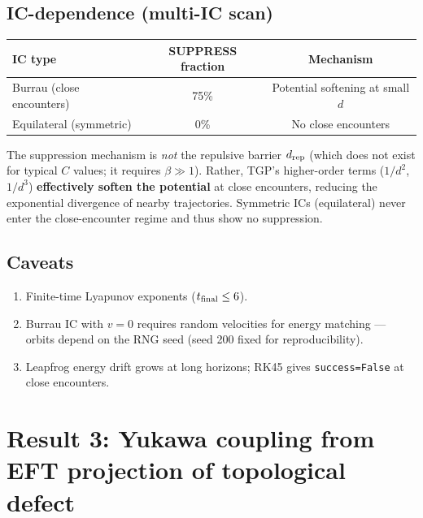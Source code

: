 \documentclass[11pt,a4paper]{article}
\newcommand{\drep}{d_{\rm rep}}
\begin{document}
\subsection{IC-dependence (multi-IC scan)}

\begin{center}
\begin{tabular}{lcc}
  \toprule
  \textbf{IC type} & \textbf{SUPPRESS fraction} & \textbf{Mechanism} \\
  \midrule
  Burrau (close encounters) & 75\% & Potential softening at small $d$ \\
  Equilateral (symmetric) & 0\% & No close encounters \\
  \bottomrule
\end{tabular}
\end{center}

The suppression mechanism is \emph{not} the repulsive barrier $\drep$
(which does not exist for typical $C$ values; it requires
$\beta \gg 1$).  Rather, TGP's higher-order terms ($1/d^2$, $1/d^3$)
\textbf{effectively soften the potential} at close encounters, reducing
the exponential divergence of nearby trajectories.  Symmetric ICs
(equilateral) never enter the close-encounter regime and thus show no
suppression.

\subsection{Caveats}

\begin{enumerate}[nosep]
  \item Finite-time Lyapunov exponents ($t_{\rm final} \leq 6$).
  \item Burrau IC with $v = 0$ requires random velocities for energy
        matching --- orbits depend on the RNG seed (seed 200 fixed for
        reproducibility).
  \item Leapfrog energy drift grows at long horizons; RK45 gives
        \texttt{success=False} at close encounters.
\end{enumerate}

\section{Result 3: Yukawa coupling from EFT projection of topological defect}
\label{sec:pathC}
\end{document}
